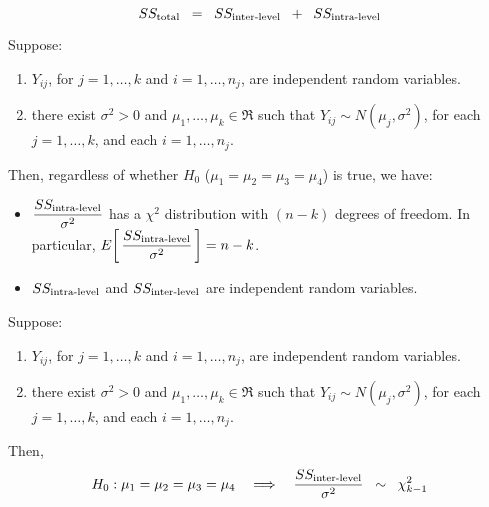 \documentclass{article}
\begin{document}
\begin{proposition}
\begin{equation*}
SS_{\textnormal{total}} \;\; = \;\; SS_{\textnormal{inter-level}} \;\; + \;\; SS_{\textnormal{intra-level}}
\end{equation*}
\end{proposition}

\begin{proposition}
\mbox{}\vskip 0.15cm\noindent
Suppose:
\begin{enumerate}
\item  $Y_{ij}$, for $j = 1, \ldots, k$ and $i = 1, \ldots, n_{j}$, are independent random variables.
\item  there exist $\sigma^{2} > 0$ and $\mu_{1}, \ldots, \mu_{k} \in \Re$ such that $Y_{ij} \sim N(\mu_{j},\sigma^{2})$, for each $j = 1, \ldots, k$, and each $i = 1, \ldots, n_{j}$.
\end{enumerate}
Then, regardless of whether $H_{0}$ ($\mu_{1} = \mu_{2} = \mu_{3} = \mu_{4}$) is true, we have:
\begin{itemize}
\item  $\dfrac{SS_{\textnormal{intra-level}}}{\sigma^{2}}$ has a $\chi^{2}$ distribution with $(n - k)$ degrees of freedom.
          In particular, $E\!\left[\,\dfrac{SS_{\textnormal{intra-level}}}{\sigma^{2}}\,\right] = n-k$.
\item  $SS_{\textnormal{intra-level}}$ and $SS_{\textnormal{inter-level}}$ are independent random variables.
\end{itemize}
\end{proposition}

\begin{proposition}\quad
\mbox{}\vskip 0.15cm\noindent
Suppose:
\begin{enumerate}
\item  $Y_{ij}$, for $j = 1, \ldots, k$ and $i = 1, \ldots, n_{j}$, are independent random variables.
\item  there exist $\sigma^{2} > 0$ and $\mu_{1}, \ldots, \mu_{k} \in \Re$ such that $Y_{ij} \sim N(\mu_{j},\sigma^{2})$, for each $j = 1, \ldots, k$, and each $i = 1, \ldots, n_{j}$.
\end{enumerate}
Then,
\begin{equation*}
H_{0}:\mu_{1} = \mu_{2} = \mu_{3} = \mu_{4}
\quad\Longrightarrow\quad
\dfrac{SS_{\textnormal{inter-level}}}{\sigma^{2}} \;\; \sim \;\; \chi^{2}_{k-1}
\end{equation*}
\end{proposition}
\end{document}
